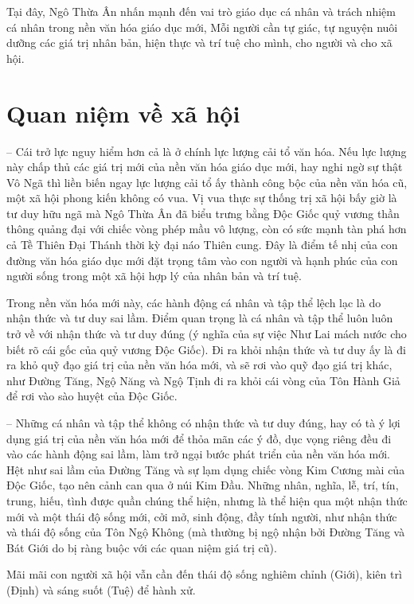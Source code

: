 Tại đây, Ngô Thừa Ân nhấn mạnh đến vai trò giáo dục cá nhân và trách nhiệm cá nhân trong nền văn hóa giáo dục mới, Mỗi người cần tự giác, tự nguyện nuôi dưỡng các giá trị nhân bản, hiện thực và trí tuệ cho mình, cho người và cho xã hội.

\section{Quan niệm về xã hội} %
\label{sec:50_51_xa_hoi}

-- Cái trở lực nguy hiểm hơn cả là ở chính lực lượng cải tổ văn hóa. Nếu lực lượng này chấp thủ các giá trị mới của nền văn hóa giáo dục mới, hay nghi ngờ sự thật Vô Ngã thì liền biến ngay lực lượng cải tổ ấy thành công bộc của nền văn hóa cũ, một xã hội phong kiến không có vua. Vị vua thực sự thống trị xã hội bấy giờ là tư duy hữu ngã mà Ngô Thừa Ân đã biểu trưng bằng Độc Giốc quỷ vương thần thông quảng đại với chiếc vòng phép mầu vô lượng, còn có sức mạnh tàn phá hơn cả Tề Thiên Đại Thánh thời kỳ đại náo Thiên cung. Đây là điểm tế nhị của con đường văn hóa giáo dục mới đặt trọng tâm vào con người và hạnh phúc của con người sống trong một xã hội hợp lý của nhân bản và trí tuệ.

Trong nền văn hóa mới này, các hành động cá nhân và tập thể lệch lạc là do nhận thức và tư duy sai lầm. Điểm quan trọng là cá nhân và tập thể luôn luôn trở về với nhận thức và tư duy đúng (ý nghĩa của sự việc Như Lai mách nước cho biết rõ cái gốc của quỷ vương Độc Giốc). Đi ra khỏi nhận thức và tư duy ấy là đi ra khỏ quỹ đạo giá trị của nền văn hóa mới, và sẽ rơi vào quỹ đạo giá trị khác, như Đường Tăng, Ngộ Năng và Ngộ Tịnh đi ra khỏi cái vòng của Tôn Hành Giả để rơi vào sào huyệt của Độc Giốc.

-- Những cá nhân và tập thể không có nhận thức và tư duy đúng, hay có tà ý lợi dụng giá trị của nền văn hóa mới để thỏa mãn các ý đồ, dục vọng riêng đều đi vào các hành động sai lầm, làm trở ngại bước phát triển của nền văn hóa mới. Hệt như sai lầm của Đường Tăng và sự lạm dụng chiếc vòng Kim Cương mài của Độc Giốc, tạo nên cảnh can qua ở núi Kim Đầu. Những nhân, nghĩa, lễ, trí, tín, trung, hiếu, tình được quần chúng thể hiện, nhưng là thể hiện qua một nhận thức mới và một thái độ sống mới, cởi mở, sinh động, đầy tính người, như nhận thức và thái độ sống của Tôn Ngộ Không (mà thường bị ngộ nhận bởi Đường Tăng và Bát Giới do bị ràng buộc với các quan niệm giá trị cũ).

Mãi mãi con người xã hội vẫn cần đến thái độ sống nghiêm chỉnh (Giới), kiên trì (Định) và sáng suốt (Tuệ) để hành xử.
